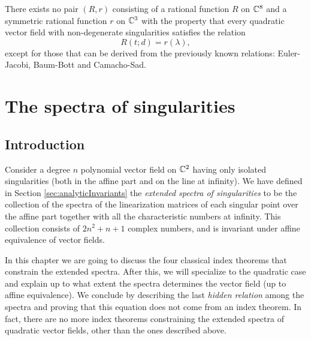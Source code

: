 \documentclass[phd,tocprelim]{cornell}
\begin{document}
\begin{theorem}\label{thm:noIndexTheorem}
 There exists no pair $(R,r)$ consisting of a rational function $R$ on $\mathbb{C}^8$ and a symmetric rational function $r$ on $\mathbb{C}^3$ with the property that every quadratic vector field with non-degenerate singularities satisfies the relation
  \[ R(t;d)=r(\lambda), \]
 except for those that can be derived from the previously known relations: Euler-Jacobi, Baum-Bott and Camacho-Sad.
\end{theorem}










\chapter{The spectra of singularities}

\section{Introduction}

Consider a degree $n$ polynomial vector field on $\mathbb{C}^2$ having only isolated singularities (both in the affine part and on the line at infinity). We have defined in Section \ref{sec:analyticInvariants} the \textit{extended spectra of singularities} to be the collection of the spectra of the linearization matrices of each singular point over the affine part together with all the characteristic numbers at infinity. This collection consists of $2n^2+n+1$ complex numbers, and is invariant under affine equivalence of vector fields.

In this chapter we are going to discuss the four classical index theorems that constrain the extended spectra. After this, we will specialize to the quadratic case and explain up to what extent the spectra determines the vector field (up to affine equivalence). We conclude by describing the last \textit{hidden relation} among the spectra and proving that this equation does not come from an index theorem. In fact, there are no more index theorems constraining the extended spectra of quadratic vector fields, other than the ones described above.


\end{document}
